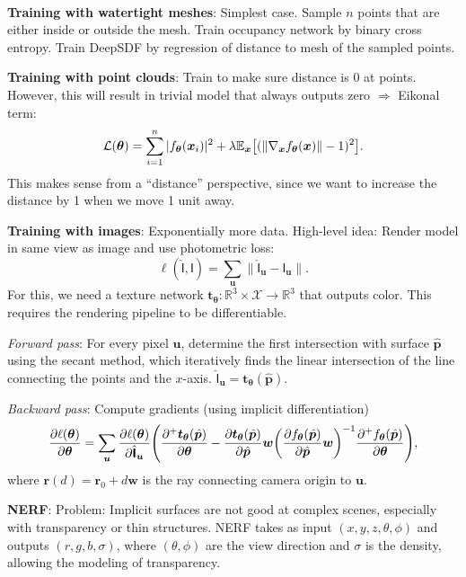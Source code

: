 \documentclass{article}
\newcommand{\lft}{\mathopen{}\mathclose\bgroup\left}
\newcommand{\rgt}{\aftergroup\egroup\right}
\newcommand{\E}{\mathbb{E}}
\newcommand{\R}{\mathbb{R}}
\renewcommand{\vec}[1]{\bm{#1}}
\newcommand{\tens}[1]{\bm{\mathsf{#1}}}
\newenvironment{topic}[1]
{\textbf{\sffamily \colorbox{black}{\rlap{\textbf{\textcolor{white}{#1}}}\hspace{\linewidth}\hspace{-2\fboxsep}}} \\ \vspace{0.2cm}}
{}
\begin{document}
\begin{multicols*}{2}
\begin{topic}{Implicit surfaces and neural radiance fields}
        \textbf{Training with watertight meshes}: Simplest case. Sample $n$ points that are either
        inside or outside the mesh. Train occupancy network by binary cross entropy. Train DeepSDF by
        regression of distance to mesh of the sampled points.

        \textbf{Training with point clouds}: Train to make sure distance is 0 at points. However, this will result in trivial model that always outputs zero $\Rightarrow$ Eikonal term: \[
            \mathcal{L}(\vec{\theta}) = \sum_{i=1}^{n} |f_{\vec{\theta}}(\vec{x}_i)|^2  + \lambda \E_{\vec{x}} \lft[ (\| \nabla_{\vec{x}} f_{\vec{\theta}}(\vec{x}) \| - 1)^2 \rgt].
        \]
        This makes sense from a ``distance'' perspective, since we want to increase the distance by 1 when
        we move 1 unit away.

        \textbf{Training with images}: Exponentially more data. High-level idea: Render model in same
        view as image and use photometric loss: \[
            \ell(\hat{\tens{I}}, \tens{I}) = \sum_{\vec{u}} \| \hat{\tens{I}}_{\vec{u}} - \tens{I}_{\vec{u}} \| .
        \]
        For this, we need a texture network $\vec{t}_{\vec{\theta}}: \R^3 \times \mathcal{X} \to \R^3$ that
        outputs color. This requires the rendering pipeline to be differentiable.

        \textit{Forward pass}: For every pixel $\vec{u}$, determine the first intersection with surface
        $\hat{\vec{p}}$ using the secant method, which iteratively finds the linear intersection of the
        line connecting the points and the $x$-axis. $\hat{\tens{I}}_{\vec{u}} =
            \vec{t}_{\vec{\theta}}(\hat{\vec{p}})$.

        \textit{Backward pass}: Compute gradients (using implicit differentiation) \[
            \pdv{\ell(\vec{\theta})}{\vec{\theta}} = \sum_{\vec{u}} \pdv{\ell(\vec{\theta})}{\hat{\tens{I}}_{\vec{u}}} \lft( \pdv{^+ \vec{t}_{\vec{\theta}}(\hat{\vec{p}})}{\vec{\theta}} - \pdv{\vec{t}_{\vec{\theta}}(\hat{\vec{p}})}{\hat{\vec{p}}} \vec{w} \lft( \pdv{f_{\vec{\theta}}(\hat{\vec{p}})}{\hat{\vec{p}}} \vec{w} \rgt)^{-1} \pdv{^+ f_{\vec{\theta}}(\hat{\vec{p}})}{\vec{\theta}} \rgt),
        \]
        where $\vec{r}(d) = \vec{r}_0 + d \vec{w}$ is the ray connecting camera origin to $\vec{u}$.

        \textbf{NERF}: Problem: Implicit surfaces are not good at complex scenes, especially with
        transparency or thin structures. NERF takes as input $(x,y,z,\theta,\phi)$ and outputs
        $(r,g,b,\sigma)$, where $(\theta,\phi)$ are the view direction and $\sigma$ is the density,
        allowing the modeling of transparency.


\end{topic}
\end{multicols*}
\end{document}
